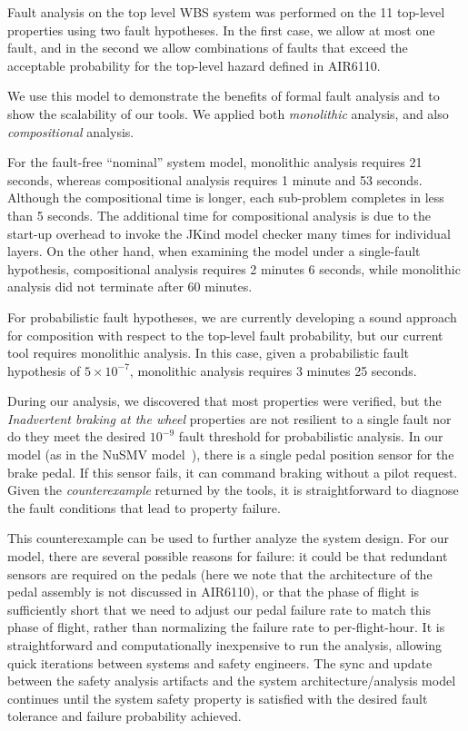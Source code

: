 Fault analysis on the top level WBS system was performed on the 11 top-level properties using two fault hypotheses.  In the first case, we allow at most one fault, and in the second we allow combinations of faults that exceed the acceptable probability for the top-level hazard defined in AIR6110.

We use this model to demonstrate the benefits of formal fault analysis and to show the scalability of our tools.  We applied both {\em monolithic} analysis, and also {\em compositional} analysis.


For the fault-free ``nominal'' system model, monolithic analysis requires 21 seconds, whereas compositional analysis requires 1 minute and 53 seconds.  Although the compositional time is longer, each sub-problem completes in less than 5 seconds.  The additional time for compositional analysis is  due to the start-up overhead to invoke the JKind model checker many times for individual layers.  On the other hand, when examining the model under a single-fault hypothesis, compositional analysis requires 2 minutes 6 seconds, while monolithic analysis did not terminate after 60 minutes.

For probabilistic fault hypotheses, we are currently developing a sound approach for composition with respect to the top-level fault probability, but our current tool requires monolithic analysis.  In this case, given a probabilistic fault hypothesis of $5\times 10^{-7}$, monolithic analysis requires 3 minutes 25 seconds.

During our analysis, we discovered that most properties were verified, but the \textit{Inadvertent braking at the wheel} properties are not resilient to a single fault nor do they meet the desired $10^{-9}$ fault threshold for probabilistic analysis.  In our model (as in the NuSMV model~\cite{DBLP:conf/cav/BozzanoCPJKPRT15}), there is a single pedal position sensor for the brake pedal.  If this sensor fails, it can command braking without a pilot request.  Given the {\em counterexample} returned by the tools, it is straightforward to diagnose the fault conditions that lead to property failure.

This counterexample can be used to further analyze the system design.  For our model, there are several possible reasons for failure: it could be that redundant sensors are required on the pedals (here we note that the architecture of the pedal assembly is not discussed in AIR6110), or that the phase of flight is sufficiently short that we need to adjust our pedal failure rate to match this phase of flight, rather than normalizing the failure rate to per-flight-hour.  It is straightforward and computationally inexpensive to run the analysis, allowing quick iterations between systems and safety engineers. 
The sync and update between the safety analysis artifacts and the system architecture/analysis model continues until the system safety property is satisfied with the desired fault tolerance and failure probability achieved.
